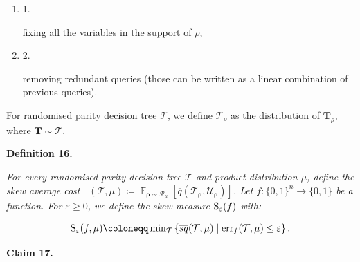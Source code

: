 \documentclass[10pt,a4paper]{article}
\begin{document}
\begin{enumerate}


\item[] 
1. 


fixing all the variables in the support of $\rho$,\par





\item[] 
2. 


removing redundant queries (those can be written as a linear combination of previous queries).\par





\end{enumerate}


For randomised parity decision tree $\mathcal{T}$, we define $\mathcal{T}_{\rho}$ as the distribution of $\bm{T}_{\rho}$, where $\bm{T}\sim\mathcal{T}$.\par





\par\medskip\noindent\textbf{
\textbf{Definition 16}\textbf{.}
}\par



\emph{For every randomised parity decision tree $\mathcal{T}$ and product distribution $\mu$, define the skew average cost $\mathop{\overline{sq}}(\mathcal{T},\mu)\coloneqq\mathop{\mathbb{E}}_{\bm{\rho}\sim\mathcal{R}_{\mu}}[\overline{q}(\mathcal{T}_{\bm{\rho}},\mathcal{U}_{\bm{\rho}})]$. Let $f\colon\{0,1\}^{n}\to\{0,1\}$ be a function. For $\varepsilon\geq 0$, we define the skew measure ${\textup{S}}_{\varepsilon}(f)$ with:}\par


\[\begin{gathered}
{\textup{S}}_{\varepsilon}(f,\mu)\coloneqq\min\nolimits_{\mathcal{T}}\left\{\mathop{\overline{sq}}(\mathcal{T},\mu)\mid\mathrm{err}_{f}(\mathcal{T},\mu)\leq\varepsilon\right\}.
\end{gathered}\]







\par\medskip\noindent\textbf{
Claim 17. 
}\par
\end{document}
